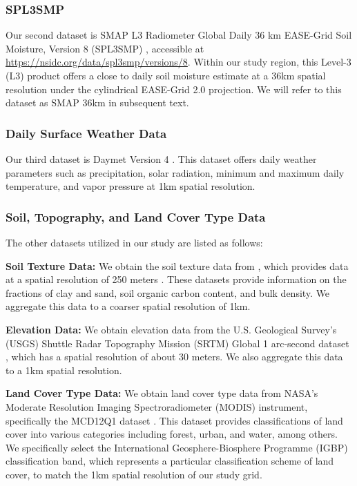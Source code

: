 \documentclass[11pt]{article}
\begin{document}
\subsubsection*{SPL3SMP}
Our second dataset is SMAP L3 Radiometer Global Daily 36 km EASE-Grid Soil Moisture, Version 8 (SPL3SMP) \citep{o2021smap}, accessible at \url{https://nsidc.org/data/spl3smp/versions/8}. Within our study region, this Level-3 (L3) product offers a close to daily soil moisture estimate at a 36km spatial resolution under the cylindrical EASE-Grid 2.0 \citep{brodzik2012ease} projection. We will refer to this dataset as SMAP 36km in subsequent text.



\subsubsection*{Daily Surface Weather Data}
Our third dataset is Daymet Version 4 \citep{thornton1840daymet}. This dataset offers daily weather parameters such as precipitation, solar radiation, minimum and maximum daily temperature, and vapor pressure at 1km spatial resolution. 

\subsubsection*{Soil, Topography, and Land Cover Type Data}
The other datasets utilized in our study are listed as follows:
\begin{description}
\item \textbf{Soil Texture Data:} We obtain the soil texture data from \citet{poggio2021soilgrids}, which provides data at a spatial resolution of 250 meters \citep{hengl2018clay}. These datasets provide information on the fractions of clay and sand, soil organic carbon content, and bulk density. We aggregate this data to a coarser spatial resolution of 1km.


\item \textbf{Elevation Data:}  We obtain elevation data from the U.S. Geological Survey's (USGS) Shuttle Radar Topography Mission (SRTM) Global 1 arc-second dataset \citep{farr2007shuttle}, which has a spatial resolution of about 30 meters. We also aggregate this data to a 1km spatial resolution.
    
    \item \textbf{Land Cover Type Data:} We obtain land cover type data from NASA's Moderate Resolution Imaging Spectroradiometer (MODIS) instrument, specifically the MCD12Q1 dataset \citep{friedl2022modis}. This dataset provides classifications of land cover into various categories including forest, urban, and water, among others. We specifically select the International Geosphere-Biosphere Programme (IGBP) classification band, which represents a particular classification scheme of land cover, to match the 1km spatial resolution of our study grid.
\end{description}
 
\end{document}
